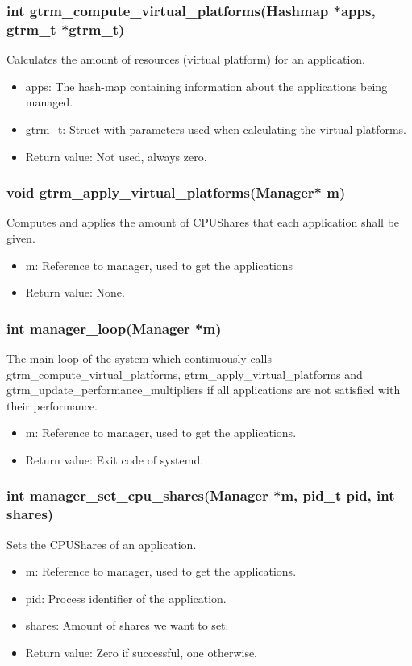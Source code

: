 \documentclass[nobiblatex]{LTHthesis}
\begin{document}
\subsubsection{int gtrm\_compute\_virtual\_platforms(Hashmap *apps, gtrm\_t *gtrm\_t)}
Calculates the amount of resources (virtual platform) for an application.
\begin{itemize}
\item apps: The hash-map containing information about the applications being managed.
\item gtrm\_t: Struct with parameters used when calculating the virtual platforms.
\item Return value: Not used, always zero.
\end{itemize}

\subsubsection{void gtrm\_apply\_virtual\_platforms(Manager* m)}
Computes and applies the amount of CPUShares that each application shall be given.
\begin{itemize}
\item m: Reference to manager, used to get the applications
\item Return value: None.
\end{itemize}

\subsubsection{int manager\_loop(Manager *m)}
The main loop of the system which continuously calls gtrm\_compute\_virtual\_platforms, gtrm\_apply\_virtual\_platforms and gtrm\_update\_performance\_multipliers if all applications are not satisfied with their performance.
\begin{itemize}
\item m: Reference to manager, used to get the applications.
\item Return value: Exit code of systemd.
\end{itemize}

\subsubsection{int manager\_set\_cpu\_shares(Manager *m, pid\_t pid, int shares)}
Sets the CPUShares of an application.
\begin{itemize}
\item m: Reference to manager, used to get the applications.
\item pid: Process identifier of the application.
\item shares: Amount of shares we want to set.
\item Return value: Zero if successful, one otherwise.
\end{itemize}
\end{document}
